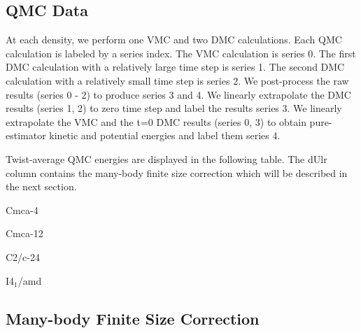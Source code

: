 \subsection{QMC Data}

At each density, we perform one VMC and two DMC calculations. Each QMC calculation is labeled by a series index. The VMC calculation is series 0. The first DMC calculation with a relatively large time step is series 1. The second DMC calculation with a relatively small time step is series 2. We post-process the raw results (series 0 - 2) to produce series 3 and 4. We linearly extrapolate the DMC results (series 1, 2) to zero time step and label the results series 3. We linearly extrapolate the VMC and the t=0 DMC results (series 0, 3) to obtain pure-estimator kinetic and potential energies and label them series 4.

Twist-average QMC energies are displayed in the following table. The dUlr column contains the many-body finite size correction which will be described in the next section.

\begin{table}[h]
\small

\caption{Cmca-4}
\end{table}

\begin{table}[h]
\small

\caption{Cmca-12}
\end{table}

\begin{table}[h]
\small

\caption{C2/c-24}
\end{table}

\begin{table}[h]
\small

\caption{I4$_1$/amd}
\end{table}

\subsection{Many-body Finite Size Correction}

